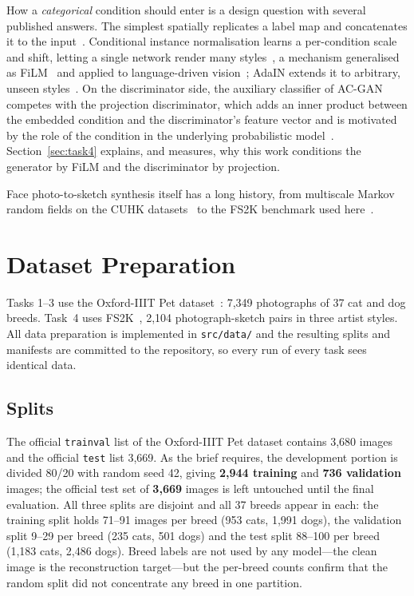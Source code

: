 \documentclass[conference]{IEEEtran}
\begin{document}
How a \emph{categorical} condition should enter is a design question with
several published answers. The simplest spatially replicates a label map and
concatenates it to the input~\cite{choi2018stargan}. Conditional instance
normalisation learns a per-condition scale and shift, letting a single network
render many styles~\cite{dumoulin2017learned}, a mechanism generalised as
FiLM~\cite{perez2018film,dumoulin2018featurewise} and applied to language-driven
vision~\cite{devries2017modulating}; AdaIN extends it to arbitrary, unseen
styles~\cite{huang2017arbitrary}. On the discriminator side, the auxiliary
classifier of AC-GAN~\cite{odena2017conditional} competes with the projection
discriminator, which adds an inner product between the embedded condition and
the discriminator's feature vector and is motivated by the role of the condition
in the underlying probabilistic model~\cite{miyato2018cgans}.
Section~\ref{sec:task4} explains, and measures, why this work conditions the
generator by FiLM and the discriminator by projection.

Face photo-to-sketch synthesis itself has a long history, from multiscale Markov
random fields on the CUHK datasets~\cite{wang2009face} to the FS2K benchmark used
here~\cite{fan2022facial}.

\section{Dataset Preparation}
\label{sec:data}

Tasks 1--3 use the Oxford-IIIT Pet dataset~\cite{parkhi2012cats,petsdata}: 7{,}349
photographs of 37 cat and dog breeds. Task~4 uses FS2K~\cite{fan2022facial,fs2kdata},
2{,}104 photograph-sketch pairs in three artist styles. All data preparation is
implemented in \texttt{src/data/} and the resulting splits and manifests are
committed to the repository, so every run of every task sees identical data.

\subsection{Splits}

The official \texttt{trainval} list of the Oxford-IIIT Pet dataset contains
3{,}680 images and the official \texttt{test} list 3{,}669. As the brief
requires, the development portion is divided 80/20 with random seed 42, giving
\textbf{2{,}944 training} and \textbf{736 validation} images; the official test
set of \textbf{3{,}669} images is left untouched until the final evaluation. All
three splits are disjoint and all 37 breeds appear in each: the training split
holds 71--91 images per breed (953 cats, 1{,}991 dogs), the validation split
9--29 per breed (235 cats, 501 dogs) and the test split 88--100 per breed
(1{,}183 cats, 2{,}486 dogs). Breed labels are not used by any model---the clean
image is the reconstruction target---but the per-breed counts confirm that the
random split did not concentrate any breed in one partition.
\end{document}
